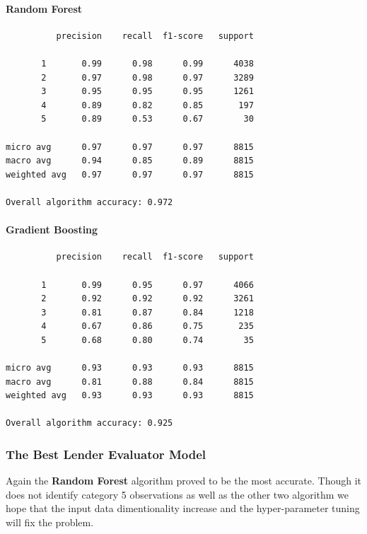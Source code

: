 \hypertarget{random-forest-1}{%
\paragraph{Random Forest}\label{random-forest-1}}

\begin{verbatim}
          precision    recall  f1-score   support

       1       0.99      0.98      0.99      4038
       2       0.97      0.98      0.97      3289
       3       0.95      0.95      0.95      1261
       4       0.89      0.82      0.85       197
       5       0.89      0.53      0.67        30

micro avg      0.97      0.97      0.97      8815
macro avg      0.94      0.85      0.89      8815
weighted avg   0.97      0.97      0.97      8815

Overall algorithm accuracy: 0.972
\end{verbatim}

\hypertarget{gradient-boosting-1}{%
\paragraph{Gradient Boosting}\label{gradient-boosting-1}}

\begin{verbatim}
          precision    recall  f1-score   support

       1       0.99      0.95      0.97      4066
       2       0.92      0.92      0.92      3261
       3       0.81      0.87      0.84      1218
       4       0.67      0.86      0.75       235
       5       0.68      0.80      0.74        35

micro avg      0.93      0.93      0.93      8815
macro avg      0.81      0.88      0.84      8815
weighted avg   0.93      0.93      0.93      8815

Overall algorithm accuracy: 0.925
\end{verbatim}

\hypertarget{the-best-lender-evaluator-model}{%
\subsubsection{The Best Lender Evaluator
Model}\label{the-best-lender-evaluator-model}}

Again the \textbf{Random Forest} algorithm proved to be the most
accurate. Though it does not identify category 5 observations as well as
the other two algorithm we hope that the input data dimentionality
increase and the hyper-parameter tuning will fix the problem.

